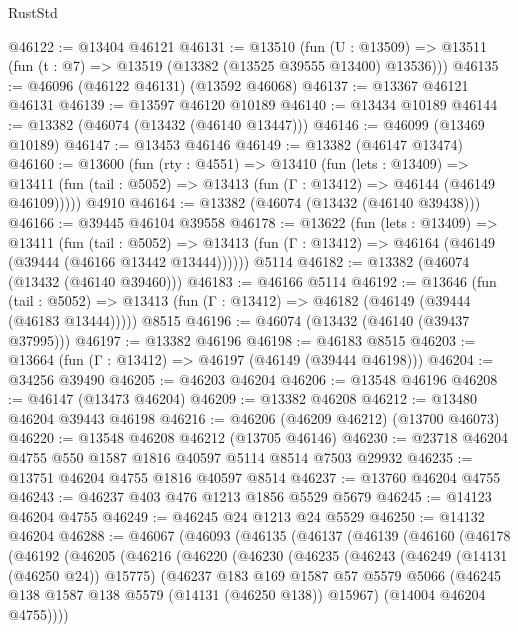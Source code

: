 \begin{lexlean}{RustStd}
\begin{coremodule}
@46122 := @13404 @46121
@46131 := @13510
    (fun (U : @13509) => @13511 (fun (t : @7) => @13519 (@13382 (@13525 @39555 @13400) @13536)))
@46135 := @46096 (@46122 @46131) (@13592 @46068)
@46137 := @13367 @46121 @46131
@46139 := @13597 @46120 @10189
@46140 := @13434 @10189
@46144 := @13382 (@46074 (@13432 (@46140 @13447)))
@46146 := @46099 (@13469 @10189)
@46147 := @13453 @46146
@46149 := @13382 (@46147 @13474)
@46160 := @13600
    (fun (rty : @4551) =>
    @13410
      (fun (lets : @13409) =>
      @13411 (fun (tail : @5052) => @13413 (fun (Γ : @13412) => @46144 (@46149 @46109)))))
    @4910
@46164 := @13382 (@46074 (@13432 (@46140 @39438)))
@46166 := @39445 @46104 @39558
@46178 := @13622
    (fun (lets : @13409) =>
    @13411
      (fun (tail : @5052) =>
      @13413 (fun (Γ : @13412) => @46164 (@46149 (@39444 (@46166 @13442 @13444))))))
    @5114
@46182 := @13382 (@46074 (@13432 (@46140 @39460)))
@46183 := @46166 @5114
@46192 := @13646
    (fun (tail : @5052) => @13413 (fun (Γ : @13412) => @46182 (@46149 (@39444 (@46183 @13444)))))
    @8515
@46196 := @46074 (@13432 (@46140 (@39437 @37995)))
@46197 := @13382 @46196
@46198 := @46183 @8515
@46203 := @13664 (fun (Γ : @13412) => @46197 (@46149 (@39444 @46198)))
@46204 := @34256 @39490
@46205 := @46203 @46204
@46206 := @13548 @46196
@46208 := @46147 (@13473 @46204)
@46209 := @13382 @46208
@46212 := @13480 @46204 @39443 @46198
@46216 := @46206 (@46209 @46212) (@13700 @46073)
@46220 := @13548 @46208 @46212 (@13705 @46146)
@46230 := @23718 @46204 @4755 @550 @1587 @1816 @40597 @5114 @8514 @7503 @29932
@46235 := @13751 @46204 @4755 @1816 @40597 @8514
@46237 := @13760 @46204 @4755
@46243 := @46237 @403 @476 @1213 @1856 @5529 @5679
@46245 := @14123 @46204 @4755
@46249 := @46245 @24 @1213 @24 @5529
@46250 := @14132 @46204
@46288 := @46067
    (@46093
      (@46135
        (@46137
          (@46139
            (@46160
              (@46178
                (@46192
                  (@46205
                    (@46216
                      (@46220
                        (@46230
                          (@46235
                            (@46243
                              (@46249 (@14131 (@46250 @24)) @15775)
                              (@46237
                                @183
                                @169
                                @1587
                                @57
                                @5579
                                @5066
                                (@46245 @138 @1587 @138 @5579 (@14131 (@46250 @138)) @15967)
                                (@14004 @46204 @4755))))

\end{coremodule}
\end{lexlean}
